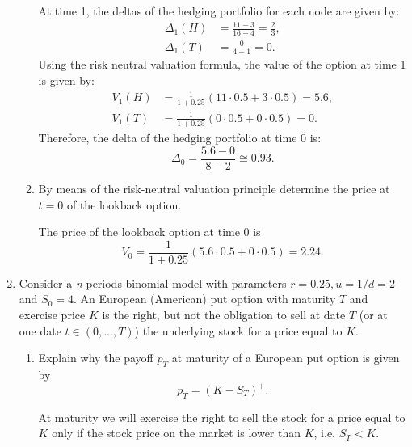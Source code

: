 \documentclass[handout,8pt]{beamer}
\begin{document}
\begin{frame}[allowframebreaks]{ }
\begin{enumerate}
\begin{enumerate}
        At time 1, the deltas of the hedging portfolio for each node are given by:
        \begin{align*}
            \Delta_1(H) &= \frac{11-3}{16-4} = \frac{2}{3},\\
            \Delta_1(T) &= \frac{0}{4-1} = 0.
        \end{align*}
        Using the risk neutral valuation formula, the value of the option at time 1 is given by:
        \begin{align*}
            V_1(H) &= \frac{1}{1+0.25}(11\cdot 0.5 + 3\cdot 0.5)= 5.6,\\
            V_1(T) &= \frac{1}{1+0.25}(0\cdot 0.5 + 0\cdot 0.5) = 0.
        \end{align*}
        Therefore, the delta of the hedging portfolio at time 0 is:
        \begin{equation*}
            \Delta_0 = \frac{5.6-0}{8-2}\cong 0.93.
        \end{equation*}
        
        \item By means of the risk-neutral valuation principle determine the price at $t=0$ of the lookback option.\newline
        
        The price of the lookback option at time 0 is
        \begin{equation*}
            V_0 = \frac{1}{1+0.25}(5.6\cdot 0.5 + 0\cdot 0.5) = 2.24.
        \end{equation*}
    \end{enumerate}
    
    
    \item Consider a \textit{n} periods binomial model with parameters $r=0.25, u=1/d=2$ and $S_0=4$. An European (American) put option with maturity $T$ and exercise price $K$ is the right, but not the obligation to sell at date $T$ (or at one date $t\in(0,...,T)$) the underlying stock for a price equal to $K$.
    
    \begin{enumerate}
        \item Explain why the payoff $p_T$ at maturity of a European put option is given by
        \begin{equation*}
            p_T=(K-S_T)^+.
        \end{equation*}
        
        At maturity we will exercise the right to sell the stock for a price equal to $K$ only if the stock price on the market is lower than $K$, i.e. $S_T < K$. \newline
        

\end{enumerate}
\end{enumerate}
\end{frame}
\end{document}

